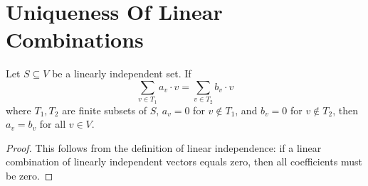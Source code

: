 \section{Uniqueness Of Linear Combinations}

\begin{theorem}
  \label{theorem :  linear_combination_unique}
  \leanok
  Let $S \subseteq V$ be a linearly independent set. If 
  $$\sum_{v \in T_1} a_v \cdot v = \sum_{v \in T_2} b_v \cdot v$$
  where $T_1, T_2$ are finite subsets of $S$, $a_v = 0$ for $v \notin T_1$, and $b_v = 0$ for $v \notin T_2$, then $a_v = b_v$ for all $v \in V$.
\end{theorem}

\begin{proof}
  This follows from the definition of linear independence: if a linear combination of linearly independent vectors equals zero, then all coefficients must be zero.
\end{proof}